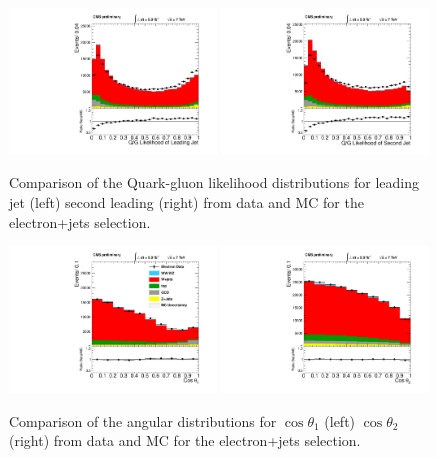 \begin{figure}[h!t]
  {\centering
    \includegraphics[width=0.49\textwidth]{plots/2012_DataMC/el_jetld_qgl.pdf}
    \includegraphics[width=0.49\textwidth]{plots/2012_DataMC/el_jetnt_qgl.pdf}
    \caption{Comparison of the Quark-gluon likelihood distributions for leading jet (left)
    second leading (right) from data and MC for the electron+jets selection.}
\label{fig:elec_jet_qgl}}
\end{figure}
\begin{figure}[h!t]
  {\centering
    \includegraphics[width=0.49\textwidth]{plots/2012_DataMC/el_ha.pdf}
    \includegraphics[width=0.49\textwidth]{plots/2012_DataMC/el_hb.pdf}
    \caption{Comparison of the angular distributions for $\cos\theta_{1}$ (left)
   $\cos\theta_{2}$ (right) from data and MC for the electron+jets selection.}
\label{fig:elec_theta}}
\end{figure}

